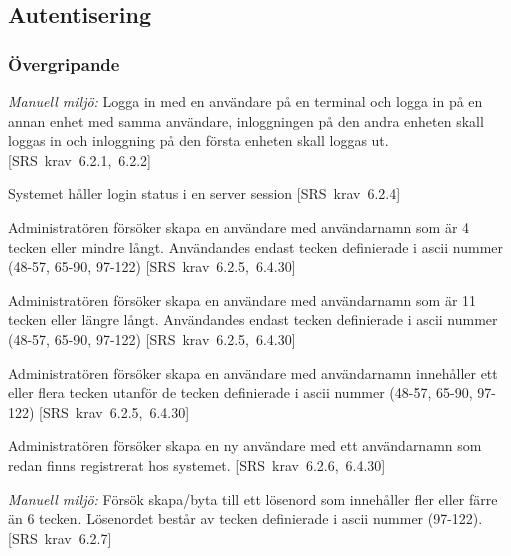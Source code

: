 \documentclass[a4paper]{article}
\def\reqinside{\hfil\penalty 100 \hfilneg \hbox}
\def \req [#1]{\reqinside{[SRS krav #1]}}
\begin{document}
\begin{appendices}






\subsection{Autentisering}
\subsubsection{Övergripande}

\begin{FT}
\item 
\emph{Manuell miljö:} Logga in med en användare på en terminal och logga in på en annan enhet med samma användare, inloggningen på den andra enheten skall loggas in och inloggning på den första enheten skall loggas ut.\req[6.2.1, 6.2.2]

\item
Systemet håller login status i en server session \req[6.2.4]

\item
Administratören försöker skapa en användare med användarnamn som är 4 tecken eller mindre långt. Användandes endast tecken definierade i ascii nummer (48-57, 65-90, 97-122)
\req[6.2.5, 6.4.30]

\item
Administratören försöker skapa en användare med användarnamn som är 11 tecken eller längre långt.
Användandes endast tecken definierade i ascii nummer (48-57, 65-90, 97-122)
\req[6.2.5, 6.4.30]

\item
Administratören försöker skapa en användare med användarnamn innehåller ett eller flera tecken utanför de tecken definierade i ascii nummer (48-57, 65-90, 97-122)
\req[6.2.5, 6.4.30]

\item
Administratören försöker skapa en ny användare med ett användarnamn som redan finns registrerat hos systemet.
\req[6.2.6, 6.4.30]

\item
\emph{Manuell miljö:} Försök skapa/byta till ett lösenord som innehåller fler eller färre än 6 tecken. Lösenordet består av tecken definierade i ascii nummer (97-122).
\req[6.2.7]


\end{FT}
\end{appendices}
\end{document}
